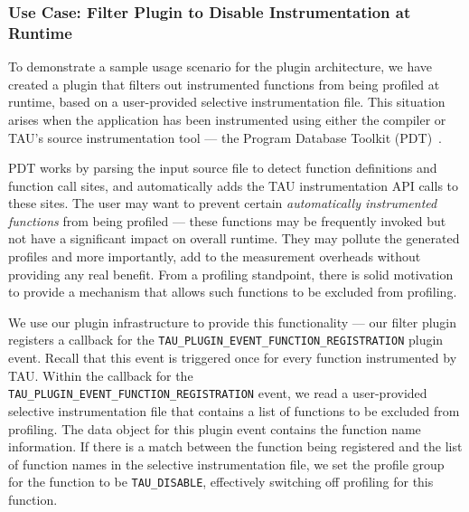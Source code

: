 \subsubsection{Use Case: Filter Plugin to Disable Instrumentation at Runtime}
To demonstrate a sample usage scenario for the plugin architecture, we have created a plugin that filters out instrumented functions from being profiled at runtime, based on a user-provided selective instrumentation file. This situation arises when the application has been instrumented using either the compiler or TAU's source instrumentation tool --- the Program Database Toolkit (PDT)~\cite{PDT}.
\par PDT works by parsing the input source file to detect function definitions and function call sites, and automatically adds the TAU instrumentation API calls to these sites. The user may want to prevent certain \textit{automatically instrumented functions} from being profiled --- these functions may be frequently invoked but not have a significant impact on overall runtime. They may pollute the generated profiles and more importantly, add to the measurement overheads without providing any real benefit. From a profiling standpoint, there is solid motivation to provide a mechanism that allows such functions to be excluded from profiling.
\par We use our plugin infrastructure to provide this functionality --- our filter plugin registers a callback for the \verb+TAU_PLUGIN_EVENT_FUNCTION_REGISTRATION+ plugin event. Recall that this event is triggered once for every function instrumented by TAU. Within the callback for the \\\verb+TAU_PLUGIN_EVENT_FUNCTION_REGISTRATION+ event, we read a user-provided selective instrumentation file that contains a list of functions to be excluded from profiling. The data object for this plugin event contains the function name information. If there is a match between the function being registered and the list of function names in the selective instrumentation file, we set the profile group for the function to be \verb+TAU_DISABLE+, effectively switching off profiling for this function.

